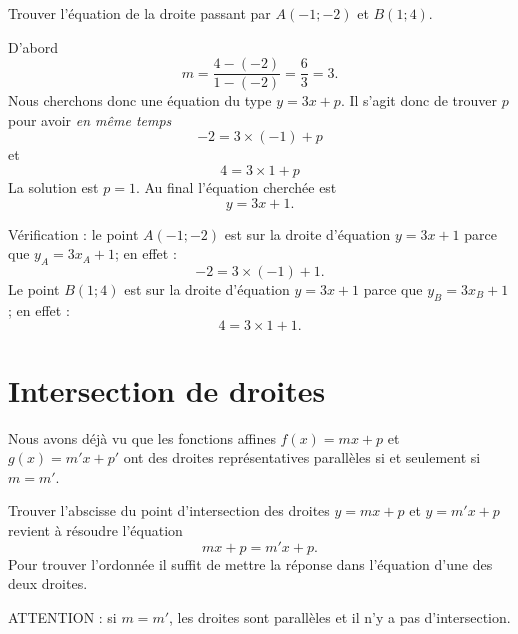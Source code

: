 \begin{example}
    Trouver l'équation de la droite passant par \( A(-1;-2)\) et \( B(1;4)\).

    D'abord
    \begin{equation}
        m=\frac{ 4-(-2) }{ 1-(-2) }=\frac{ 6 }{ 3 }=3.
    \end{equation}
    Nous cherchons donc une équation du type \( y=3x+p\). Il s'agit donc de trouver \( p\) pour avoir \emph{en même temps}
    \begin{equation}
            -2=3\times (-1)+p
    \end{equation}
    et
    \begin{equation}
        4=3\times 1+p
    \end{equation}
    La solution est \( p=1\). Au final l'équation cherchée est
    \begin{equation}
        y=3x+1.
    \end{equation}

    Vérification : le point \( A(-1;-2)\) est sur la droite d'équation \( y=3x+1\) parce que \( y_A=3x_A+1\); en effet :
    \begin{equation}
        -2=3\times (-1)+1.
    \end{equation}
    Le point \( B(1;4)\) est sur la droite d'équation \( y=3x+1\) parce que \( y_B=3x_B+1\); en effet :
    \begin{equation}
        4=3\times 1+1.
    \end{equation}
\end{example}

\section{Intersection de droites}

Nous avons déjà vu que les fonctions affines \( f(x)=mx+p\) et \( g(x)=m'x+p'\) ont des droites représentatives parallèles si et seulement si \( m=m'\).

\begin{Aretenir}
    Trouver l'abscisse du point d'intersection des droites \( y=mx+p\) et \( y=m'x+p\) revient à résoudre l'équation
    \begin{equation}
        mx+p=m'x+p.
    \end{equation}
    Pour trouver l'ordonnée il suffit de mettre la réponse dans l'équation d'une des deux droites.

    ATTENTION : si \( m=m'\), les droites sont parallèles et il n'y a pas d'intersection.
\end{Aretenir}

